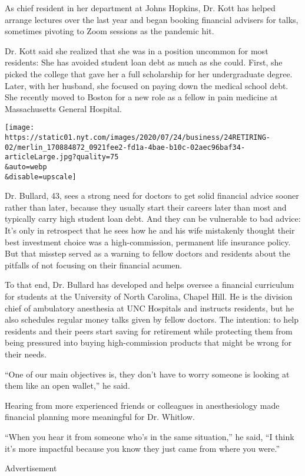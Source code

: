 As chief resident in her department at Johns Hopkins, Dr. Kott has
helped arrange lectures over the last year and began booking financial
advisers for talks, sometimes pivoting to Zoom sessions as the pandemic
hit.

Dr. Kott said she realized that she was in a position uncommon for most
residents: She has avoided student loan debt as much as she could.
First, she picked the college that gave her a full scholarship for her
undergraduate degree. Later, with her husband, she focused on paying
down the medical school debt. She recently moved to Boston for a new
role as a fellow in pain medicine at Massachusetts General Hospital.

\texttt{[image: https://static01.nyt.com/images/2020/07/24/business/24RETIRING-02/merlin\_170884872\_0921fee2-fd1a-4bae-b10c-02aec96baf34-articleLarge.jpg?quality=75\\\&auto=webp\\\&disable=upscale]}

Dr. Bullard, 43, sees a strong need for doctors to get solid financial
advice sooner rather than later, because they usually start their
careers later than most and typically carry high student loan debt. And
they can be vulnerable to bad advice: It's only in retrospect that he
sees how he and his wife mistakenly thought their best investment choice
was a high-commission, permanent life insurance policy. But that misstep
served as a warning to fellow doctors and residents about the pitfalls
of not focusing on their financial acumen.

To that end, Dr. Bullard has developed and helps oversee a financial
curriculum for students at the University of North Carolina, Chapel
Hill. He is the division chief of ambulatory anesthesia at UNC Hospitals
and instructs residents, but he also schedules regular money talks given
by fellow doctors. The intention: to help residents and their peers
start saving for retirement while protecting them from being pressured
into buying high-commission products that might be wrong for their
needs.

``One of our main objectives is, they don't have to worry someone is
looking at them like an open wallet,'' he said.

Hearing from more experienced friends or colleagues in anesthesiology
made financial planning more meaningful for Dr. Whitlow.

``When you hear it from someone who's in the same situation,'' he said,
``I think it's more impactful because you know they just came from where
you were.''

Advertisement

